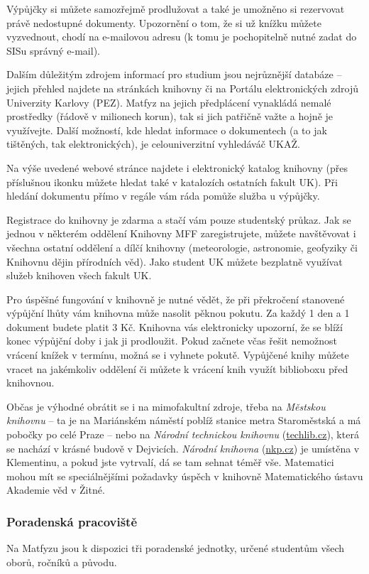 Výpůjčky si můžete samozřejmě prodlužovat a také je umožněno si rezervovat právě
nedostupné dokumenty. Upozornění o tom, že si už knížku můžete vyzvednout, chodí
na e-mailovou adresu (k tomu je pochopitelně nutné zadat do SISu správný
e-mail).

Dalším důležitým zdrojem informací pro studium jsou nejrůznější databáze –
jejich přehled najdete na stránkách knihovny či na Portálu elektronických zdrojů
Univerzity Karlovy (PEZ). Matfyz na jejich předplácení vynakládá nemalé
prostředky (řádově v milionech korun), tak si jich patřičně važte a hojně je
využívejte. Další možností, kde hledat informace o dokumentech (a to jak
tištěných, tak elektronických), je celouniverzitní vyhledáváč UKAŽ.

Na výše uvedené webové stránce najdete i elektronický katalog knihovny (přes
příslušnou ikonku můžete hledat také v katalozích ostatních fakult UK). Při
hledání dokumentu přímo v regále vám ráda pomůže služba u výpůjčky.

Registrace do knihovny je zdarma a stačí vám pouze studentský průkaz. Jak se
jednou v některém oddělení Knihovny MFF zaregistrujete, můžete navštěvovat i
všechna ostatní oddělení a dílčí knihovny (meteorologie, astronomie, geofyziky
či Knihovnu dějin přírodních věd). Jako student UK můžete bezplatně využívat
služeb knihoven všech fakult UK.

Pro úspěšné fungování v knihovně je nutné vědět, že při překročení stanovené
výpůjční lhůty vám knihovna může nasolit pěknou pokutu. Za každý 1 den a 1
dokument budete platit 3 Kč. Knihovna vás elektronicky upozorní, že se blíží
konec výpůjční doby i jak ji prodloužit. Pokud začnete včas řešit nemožnost
vrácení knížek v termínu, možná se i vyhnete pokutě. Vypůjčené knihy můžete
vracet na jakémkoliv oddělení či můžete k vrácení knih využít biblioboxu před
knihovnou.


Občas je výhodné obrátit se i na mimofakultní zdroje, třeba na \textit{Městskou
knihovnu} – ta je na Mariánském náměstí poblíž stanice metra Staroměstská a má
pobočky po celé Praze – nebo na \textit{Národní technickou knihovnu}
(\url{techlib.cz}), která se nachází v krásné budově v Dejvicích.
\textit{Národní knihovna} (\url{nkp.cz}) je umístěna v Klementinu, a pokud jste
vytrvalí, dá se tam sehnat téměř vše. Matematici mohou mít se speciálnějšími
požadavky úspěch v knihovně Matematického ústavu Akademie věd v Žitné.


\subsubsection{Poradenská pracoviště}
Na Matfyzu jsou k dispozici tři poradenské jednotky, určené studentům všech
oborů, ročníků a původu.


